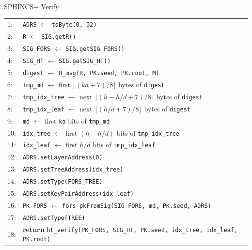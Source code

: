 \begin{subsection}{SPHINCS+ Verify}
\begin{algorithm}
    \begin{tabular}{ll}
        1:  & \texttt{ADRS} $\leftarrow$ \texttt{toByte(0, 32)} \\
        2:  & \texttt{R} $\leftarrow$ \texttt{SIG.getR()} \\
        3:  & \texttt{SIG\_FORS} $\leftarrow$ \texttt{SIG.getSIG\_FORS()} \\
        4:  & \texttt{SIG\_HT} $\leftarrow$ \texttt{SIG.getSIG\_HT()} \\
        5:  & \texttt{digest} $\leftarrow$ \texttt{H\_msg(R, PK.seed, PK.root, M)} \\
        6:  & \texttt{tmp\_md} $\leftarrow$ first $\lfloor(\mathit{ka}+7)/8\rfloor$ bytes of \texttt{digest} \\
        7:  & \texttt{tmp\_idx\_tree} $\leftarrow$ next $\lfloor(h - h/d +7)/8\rfloor$ bytes of \texttt{digest} \\
        8:  & \texttt{tmp\_idx\_leaf} $\leftarrow$ next $\lfloor(h/d +7)/8\rfloor$ bytes of \texttt{digest} \\
        9:  & \texttt{md} $\leftarrow$ first \texttt{ka} bits of \texttt{tmp\_md} \\
        10: & \texttt{idx\_tree} $\leftarrow$ first $(h - h/d)$ bits of \texttt{tmp\_idx\_tree} \\
        11: & \texttt{idx\_leaf} $\leftarrow$ first $h/d$ bits of \texttt{tmp\_idx\_leaf} \\
        12: & \texttt{ADRS.setLayerAddress(0)} \\
        13: & \texttt{ADRS.setTreeAddress(idx\_tree)} \\
        14: & \texttt{ADRS.setType(FORS\_TREE)} \\
        15: & \texttt{ADRS.setKeyPairAddress(idx\_leaf)} \\
        16: & \texttt{PK\_FORS} $\leftarrow$ \texttt{fors\_pkFromSig(SIG\_FORS, md, PK.seed, ADRS)} \\
        17: & \texttt{ADRS.setType(TREE)} \\
        18: & \textbf{return} \texttt{ht\_verify(PK\_FORS, SIG\_HT, PK.seed, idx\_tree, idx\_leaf, PK.root)} \\
    \end{tabular}
\end{algorithm}


\end{subsection}
